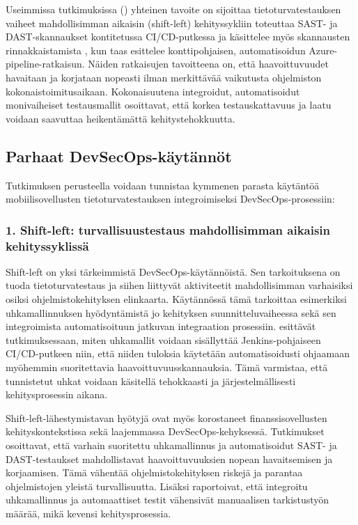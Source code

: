 \documentclass[bscthesis,finnish,oneside,biblatex]{uefcsthesis}
\begin{document}
    Useimmissa tutkimuksissa (\cite{marandi2023_ias,dupont2021_incremental,kushwaha2024_cct,feio2024_empirical}) yhteinen tavoite on sijoittaa tietoturvatestauksen vaiheet mahdollisimman aikaisin (shift-left) kehityssykliin  \cite{marandi2023_ias} toteuttaa SAST- ja DAST-skannaukset kontitetussa CI/CD-putkessa ja käsittelee myös skannausten rinnakkaistamista , kun taas \cite{kushwaha2024_cct} esittelee konttipohjaisen, automatisoidun Azure-pipeline-ratkaisun. Näiden ratkaisujen tavoitteena on, että haavoittuvuudet havaitaan ja korjataan nopeasti ilman merkittävää vaikutusta ohjelmiston kokonaistoimitusaikaan. Kokonaisuutena integroidut, automatisoidut monivaiheiset testausmallit osoittavat, että korkea testauskattavuus ja laatu voidaan saavuttaa heikentämättä kehitystehokkuutta.

    \subsection{Parhaat DevSecOps-käytännöt}

    Tutkimuksen perusteella voidaan tunnistaa kymmenen parasta käytäntöä mobiilisovellusten tietoturvatestauksen integroimiseksi DevSecOps-prosessiin:

    \subsubsection{1. Shift-left: turvallisuustestaus mahdollisimman aikaisin kehityssyklissä}

    Shift-left on yksi tärkeimmistä DevSecOps-käytännöistä. Sen tarkoituksena on tuoda tietoturvatestaus ja siihen liittyvät aktiviteetit mahdollisimman varhaisiksi osiksi ohjelmistokehityksen elinkaarta. Käytännössä tämä tarkoittaa esimerkiksi uhkamallinnuksen hyödyntämistä jo kehityksen suunnitteluvaiheessa sekä sen integroimista automatisoituun jatkuvan integraation prosessiin. \cite{nikolov2024_fit} esittävät tutkimuksessaan, miten uhkamallit voidaan sisällyttää Jenkins-pohjaiseen CI/CD-putkeen niin, että niiden tuloksia käytetään automatisoidusti ohjaamaan myöhemmin suoritettavia haavoittuvuusskannauksia. Tämä varmistaa, että tunnistetut uhkat voidaan käsitellä tehokkaasti ja järjestelmällisesti kehitysprosessin aikana.

    Shift-left-lähestymistavan hyötyjä ovat myös korostaneet \cite{kushwaha2024_cct} finanssisovellusten kehityskontekstissa sekä \cite{feio2024_empirical} laajemmassa DevSecOps-kehyksessä. Tutkimukset osoittavat, että varhain suoritettu uhkamallinnus ja automatisoidut SAST- ja DAST-testaukset mahdollistavat haavoittuvuuksien nopean havaitsemisen ja korjaamisen. Tämä vähentää ohjelmistokehityksen riskejä ja parantaa ohjelmistojen yleistä turvallisuutta. Lisäksi \cite{kushwaha2024_cct} raportoivat, että integroitu uhkamallinnus ja automaattiset testit vähensivät manuaalisen tarkistustyön määrää, mikä kevensi kehitysprosessia.
\end{document}
